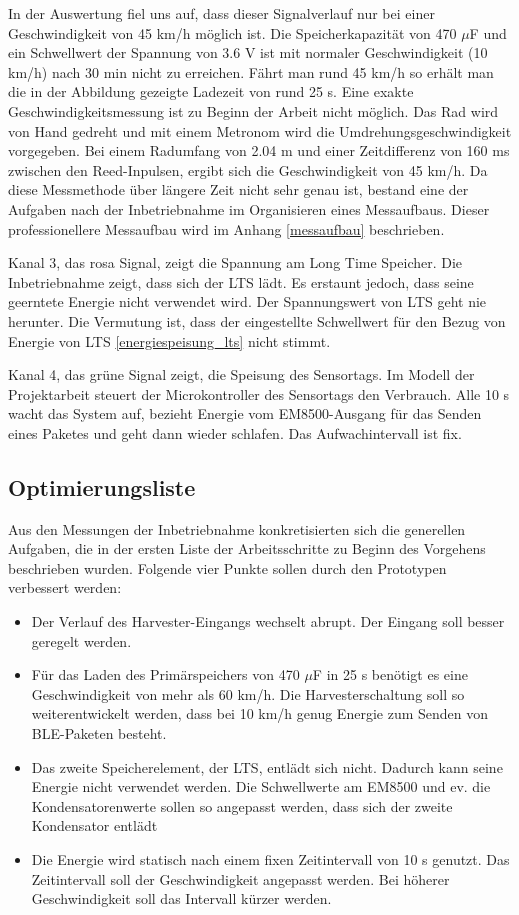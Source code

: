 In der Auswertung fiel uns auf, dass dieser Signalverlauf nur bei einer Geschwindigkeit von 45 km/h möglich ist. Die Speicherkapazität von 470 $\mu$F und ein Schwellwert der Spannung von 3.6 V ist mit normaler Geschwindigkeit (10 km/h) nach 30 min nicht zu erreichen. Fährt man rund 45 km/h so erhält man die in der Abbildung gezeigte Ladezeit von rund 25 s. Eine exakte Geschwindigkeitsmessung ist zu Beginn der Arbeit nicht möglich. Das Rad wird von Hand gedreht und mit einem Metronom wird die Umdrehungsgeschwindigkeit vorgegeben. Bei einem Radumfang von 2.04 m und einer Zeitdifferenz von 160 ms zwischen den Reed-Inpulsen, ergibt sich die Geschwindigkeit von 45 km/h. Da diese Messmethode über längere Zeit nicht sehr genau ist, bestand eine der Aufgaben nach der Inbetriebnahme im Organisieren eines Messaufbaus. Dieser professionellere Messaufbau wird im Anhang \ref{messaufbau} beschrieben.


Kanal 3, das rosa Signal, zeigt die Spannung am Long Time Speicher. Die Inbetriebnahme zeigt, dass sich der LTS lädt. Es erstaunt jedoch, dass seine geerntete Energie nicht verwendet wird. Der Spannungswert von LTS geht nie herunter.
Die Vermutung ist, dass der eingestellte Schwellwert für den Bezug von Energie von LTS \ref{energiespeisung_lts} nicht stimmt.

Kanal 4, das grüne Signal zeigt, die Speisung des Sensortags. Im Modell der Projektarbeit steuert der Microkontroller des Sensortags den Verbrauch. Alle 10 s wacht das System auf, bezieht Energie vom EM8500-Ausgang für das Senden eines Paketes und geht dann wieder schlafen. Das Aufwachintervall ist fix.


\subsection{Optimierungsliste}\label{optimierung} 

Aus den Messungen der Inbetriebnahme konkretisierten sich die generellen Aufgaben, die in der ersten Liste der Arbeitsschritte zu Beginn des Vorgehens  beschrieben wurden. Folgende vier Punkte sollen durch den Prototypen verbessert werden: 

\begin{itemize}
     \item Der Verlauf des Harvester-Eingangs wechselt abrupt. Der Eingang soll besser geregelt werden. 
     \item Für das Laden des Primärspeichers von 470 $\mu$F in 25 s benötigt es eine Geschwindigkeit von mehr als 60 km/h.  Die Harvesterschaltung soll so weiterentwickelt werden, dass bei 10 km/h genug Energie zum Senden von BLE-Paketen besteht.    
     \item Das zweite Speicherelement, der LTS, entlädt sich nicht. Dadurch kann seine Energie nicht verwendet werden. Die Schwellwerte am EM8500 und ev. die Kondensatorenwerte sollen so angepasst werden, dass sich der zweite Kondensator entlädt
     \item Die Energie wird statisch nach einem fixen Zeitintervall von 10 s genutzt. Das Zeitintervall soll der Geschwindigkeit angepasst werden. Bei höherer Geschwindigkeit soll das Intervall kürzer werden.
\end{itemize} 



